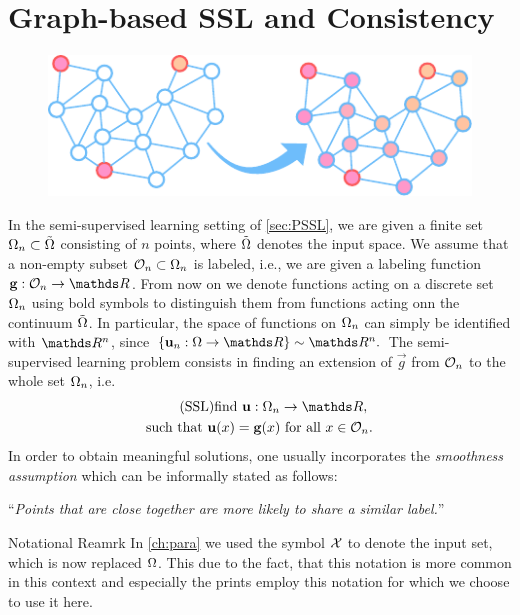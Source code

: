 \section{Graph-based SSL and Consistency}\label{sec:GSSL}

\begin{figure}
\centering
\includegraphics[width=.5\textwidth]{atelier/paradigms/GSSL.pdf}
\end{figure}

In the semi-supervised learning setting of \cref{sec:PSSL}, we are given a finite set $\Omega_n\subset \tilde{\Omega}$ consisting of $n$ points, where $\tilde{\Omega}$ 
denotes the input space. We assume that a non-empty subset $\mathcal{O}_n \subset \Omega_n$ is labeled, i.e., we are given a labeling function
$\vec g:\conset_n\to\R$. From now on we denote functions acting on a discrete set $\Omega_n$ using bold symbols to distinguish them from functions acting onn the continuum $\tilde{\Omega}$. In particular, the space of functions on $\Omega_n$ can simply be identified with $\R^n$, since $\{\vec u_n:\domain\to\R\} \sim \R^n.$
%
\noindent%
The semi-supervised learning problem consists in finding an extension of $\vec g$ from $\mathcal{O}_n$ to the whole set $\Omega_n$, i.e.
%
\begin{gather}\label{eq:SSL}
\begin{gathered}\tag{SSL}
\text{find } \vec u:\domain_n\to\R,\\
\text{such that } \vec u(x) = \vec g(x) \text{ for all } x\in\conset_n.
\end{gathered}
\end{gather}
%
%
%
%
In order to obtain meaningful solutions, one usually incorporates the \emph{smoothness assumption} \cite{subramanya2014graph} which can be informally stated as follows:
%
\begin{center}
\enquote{\textit{Points that are close together are more likely to share a similar label.}}
\end{center}
%
%

\begin{remark}{Notational Reamrk}{}
In \cref{ch:para} we used the symbol $\mathcal{X}$ to denote the input set, which is now replaced $\Omega$. This due to the fact, that this notation is more common in this context and especially the prints \cite{bungert2021uniform, bungert2022ratio, roith2022continuum} employ this notation for which we choose to use it here.
\end{remark}
%
%
